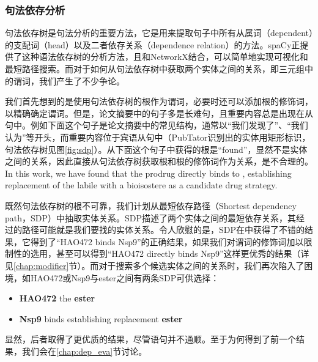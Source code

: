 \documentclass[twocolumn]{article}
\begin{document}
\subsubsection{句法依存分析\label{chap:dep}}
句法依存树是句法分析的重要方法，它是用来提取句子中所有从属词（dependent）的支配词（head）以及二者依存关系（dependence relation）的方法。spaCy正提供了这种语法依存树的分析方法，且和NetworkX结合，可以简单地实现可视化和最短路径搜索。而对于如何从句法依存树中获取两个实体之间的关系，即三元组中的谓词，我们产生了不少争论。\par
我们首先想到的是使用句法依存树的根作为谓词，必要时还可以添加根的修饰词，以精确确定谓词。但是，论文摘要中的句子多是长难句，且重要内容总是出现在从句中。例如下面这个句子是论文摘要中的常见结构，通常以“我们发现了”、“我们认为”等开头，而重要内容位于宾语从句中（PubTator识别出的实体用矩形标识，句法依存树见图\ref{fig:sdp}）。从下面这个句子中获得的根是“found”，显然不是实体之间的关系，因此直接从句法依存树获取根和根的修饰词作为关系，是不合理的。\\
In this work, we have found that the prodrug  directly binds to , establishing replacement of the labile  with a bioisostere as a candidate drug strategy.\cite{hao472}\par
既然句法依存树的根不可靠，我们计划从最短依存路径（Shortest dependency path，SDP）中抽取实体关系。SDP描述了两个实体之间的最短依存关系，其经过的路径可能就是我们要找的实体关系。令人欣慰的是，SDP在\cite{hao472}中获得了不错的结果，它得到了“HAO472 binds Nsp9”的正确结果，如果我们对谓词的修饰词加以限制性的选用，甚至可以得到“HAO472 directly binds Nsp9”这样更优秀的结果（详见\ref{chap:modifier}节）。而对于搜索多个候选实体之间的关系时，我们再次陷入了困境，如HAO472或Nsp9与ester之间有两条SDP可供选择：\par
\begin{itemize}
	\item \textbf{HAO472} the \textbf{ester}
	\item \textbf{Nsp9} binds establishing replacement \textbf{ester}
\end{itemize}\par
显然，后者取得了更优质的结果，尽管语句并不通顺。至于为何得到了前一个结果，我们会在\ref{chap:dep_eva}节讨论。\par
\end{document}

